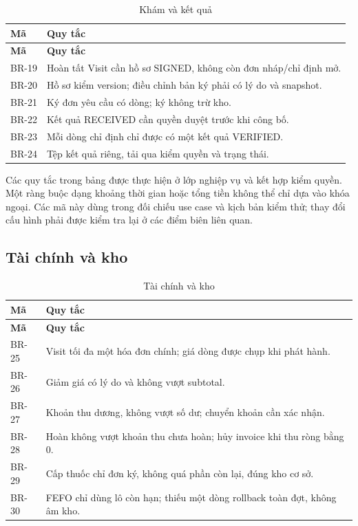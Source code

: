 {\small\setlength{\tabcolsep}{3pt}\renewcommand{\arraystretch}{1.12}
\begin{longtable}{@{}L{\textwidth-0.72pt\relax} L{\textwidth-5.28pt\relax}@{}}
\caption{Khám và kết quả}\\
\toprule
\textbf{Mã} & \textbf{Quy tắc}\\\midrule
\endfirsthead
\toprule
\textbf{Mã} & \textbf{Quy tắc}\\\midrule
\endhead
\bottomrule\endlastfoot
BR-19 & Hoàn tất Visit cần hồ sơ SIGNED, không còn đơn nháp/\allowbreak{}chỉ định mở.\allowbreak{}\\[3pt]
BR-20 & Hồ sơ kiểm version; điều chỉnh bản ký phải có lý do và snapshot.\allowbreak{}\\[3pt]
BR-21 & Ký đơn yêu cầu có dòng; ký không trừ kho.\allowbreak{}\\[3pt]
BR-22 & Kết quả RECEIVED cần quyền duyệt trước khi công bố.\allowbreak{}\\[3pt]
BR-23 & Mỗi dòng chỉ định chỉ được có một kết quả VERIFIED.\allowbreak{}\\[3pt]
BR-24 & Tệp kết quả riêng, tải qua kiểm quyền và trạng thái.\allowbreak{}\\[3pt]
\end{longtable}}
Các quy tắc trong bảng được thực hiện ở lớp nghiệp vụ và kết hợp kiểm quyền.\allowbreak{} Một ràng buộc dạng khoảng thời gian hoặc tổng tiền không thể chỉ dựa vào khóa ngoại.\allowbreak{} Các mã này dùng trong đối chiếu use case và kịch bản kiểm thử; thay đổi cấu hình phải được kiểm tra lại ở các điểm biên liên quan.\allowbreak{}

\clearpage

\subsection{Tài chính và kho}

{\small\setlength{\tabcolsep}{3pt}\renewcommand{\arraystretch}{1.12}
\begin{longtable}{@{}L{\textwidth-0.72pt\relax} L{\textwidth-5.28pt\relax}@{}}
\caption{Tài chính và kho}\\
\toprule
\textbf{Mã} & \textbf{Quy tắc}\\\midrule
\endfirsthead
\toprule
\textbf{Mã} & \textbf{Quy tắc}\\\midrule
\endhead
\bottomrule\endlastfoot
BR-25 & Visit tối đa một hóa đơn chính; giá dòng được chụp khi phát hành.\allowbreak{}\\[3pt]
BR-26 & Giảm giá có lý do và không vượt subtotal.\allowbreak{}\\[3pt]
BR-27 & Khoản thu dương, không vượt số dư; chuyển khoản cần xác nhận.\allowbreak{}\\[3pt]
BR-28 & Hoàn không vượt khoản thu chưa hoàn; hủy invoice khi thu ròng bằng 0.\allowbreak{}\\[3pt]
BR-29 & Cấp thuốc chỉ đơn ký, không quá phần còn lại, đúng kho cơ sở.\allowbreak{}\\[3pt]
BR-30 & FEFO chỉ dùng lô còn hạn; thiếu một dòng rollback toàn đợt, không âm kho.\allowbreak{}\\[3pt]
\end{longtable}}

